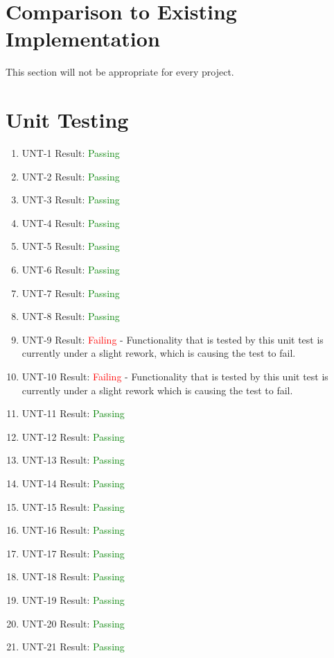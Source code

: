 \documentclass[12pt, titlepage]{article}
\begin{document}
\section{Comparison to Existing Implementation}

This section will not be appropriate for every project.

\section{Unit Testing}

\begin{enumerate}
  \item UNT-1
        Result: \textcolor{green}{Passing}
  \item UNT-2
        Result: \textcolor{green}{Passing}
  \item UNT-3
        Result: \textcolor{green}{Passing}
  \item UNT-4
        Result: \textcolor{green}{Passing}
  \item UNT-5
        Result: \textcolor{green}{Passing}
  \item UNT-6
        Result: \textcolor{green}{Passing}
  \item UNT-7
        Result: \textcolor{green}{Passing}
  \item UNT-8
        Result: \textcolor{green}{Passing}
  \item UNT-9
        Result: \textcolor{red}{Failing} - Functionality that is tested by this unit test is currently under a slight rework, which is causing the test to fail.
  \item UNT-10
        Result: \textcolor{red}{Failing} - Functionality that is tested by this unit test is currently under a slight rework which is causing the test to fail.
  \item UNT-11
        Result: \textcolor{green}{Passing}
  \item UNT-12
        Result: \textcolor{green}{Passing}
  \item UNT-13
        Result: \textcolor{green}{Passing}
  \item UNT-14
        Result: \textcolor{green}{Passing}
  \item UNT-15
        Result: \textcolor{green}{Passing}
  \item UNT-16
        Result: \textcolor{green}{Passing}
  \item UNT-17
        Result: \textcolor{green}{Passing}
  \item UNT-18
        Result: \textcolor{green}{Passing}
  \item UNT-19
        Result: \textcolor{green}{Passing}
  \item UNT-20
        Result: \textcolor{green}{Passing}
  \item UNT-21
        Result: \textcolor{green}{Passing}
\end{enumerate}
\end{document}
